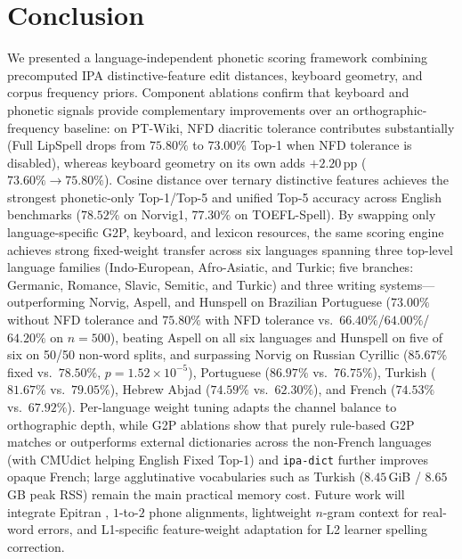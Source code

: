 \documentclass[
  journal=nlp,
  manuscript=research-article,
  year=2026,
]{cup-journal}
\begin{document}
\section{Conclusion}
\label{sec:conclusion}
We presented a language-independent phonetic scoring framework combining precomputed IPA distinctive-feature edit distances, keyboard geometry, and corpus frequency priors. Component ablations confirm that keyboard and phonetic signals provide complementary improvements over an orthographic-frequency baseline: on PT-Wiki, NFD diacritic tolerance contributes substantially (Full LipSpell drops from $75.80\%$ to $73.00\%$ Top-1 when NFD tolerance is disabled), whereas keyboard geometry on its own adds $+2.20$\,pp ($73.60\% \rightarrow 75.80\%$). Cosine distance over ternary distinctive features achieves the strongest phonetic-only Top-1/Top-5 and unified Top-5 accuracy across English benchmarks ($78.52\%$ on Norvig1, $77.30\%$ on TOEFL-Spell). By swapping only language-specific G2P, keyboard, and lexicon resources, the same scoring engine achieves strong fixed-weight transfer across six languages spanning three top-level language families (Indo-European, Afro-Asiatic, and Turkic; five branches: Germanic, Romance, Slavic, Semitic, and Turkic) and three writing systems---outperforming Norvig, Aspell, and Hunspell on Brazilian Portuguese ($73.00\%$ without NFD tolerance and $75.80\%$ with NFD tolerance vs.\ $66.40\%$/$64.00\%$/$64.20\%$ on $n=500$), beating Aspell on all six languages and Hunspell on five of six on 50/50 non-word splits, and surpassing Norvig on Russian Cyrillic ($85.67\%$ fixed vs.\ $78.50\%$, $p=1.52\times 10^{-5}$), Portuguese ($86.97\%$ vs.\ $76.75\%$), Turkish ($81.67\%$ vs.\ $79.05\%$), Hebrew Abjad ($74.59\%$ vs.\ $62.30\%$), and French ($74.53\%$ vs.\ $67.92\%$). Per-language weight tuning adapts the channel balance to orthographic depth, while G2P ablations show that purely rule-based G2P matches or outperforms external dictionaries across the non-French languages (with CMUdict helping English Fixed Top-1) and \texttt{ipa-dict} further improves opaque French; large agglutinative vocabularies such as Turkish ($8.45$\,GiB / $8.65$\,GB peak RSS) remain the main practical memory cost. Future work will integrate Epitran \parencite{mortensen2018epitran}, $1$-to-$2$ phone alignments, lightweight $n$-gram context for real-word errors, and L1-specific feature-weight adaptation for L2 learner spelling correction.

\printbibliography

\appendix
\end{document}
